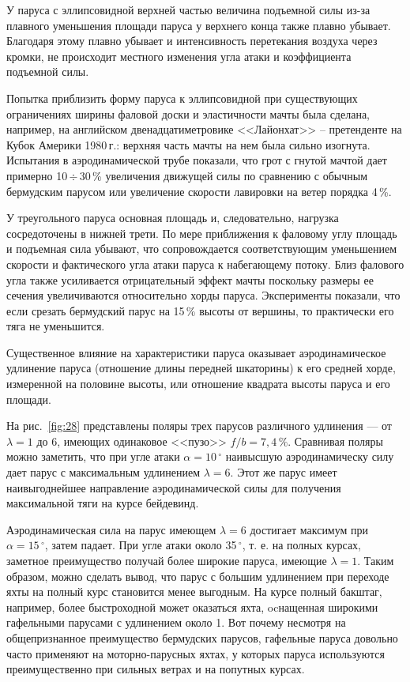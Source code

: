 \documentclass[a4paper, 12pt, twoside, final, book, russian, fittopage, cyremdash]{ncc}
\newcommand{\gr}{\ensuremath{\,^\circ}\xspace}
\newcommand{\otdo}{\,\ensuremath{\div}\,}
\newcommand{\ris}[1]{\ref{fig:#1}}
\begin{document}
У паруса с эллипсовидной верхней частью величина подъемной силы из-за плавного уменьшения площади паруса у верхнего конца также плавно убывает. Благодаря этому плавно убывает и интенсивность перетекания воздуха через кромки, не происходит местного изменения угла атаки и коэффициента подъемной силы. 

Попытка приблизить форму паруса к эллипсовидной при существующих ограничениях ширины фаловой доски и эластичности мачты была сделана, например, на английском двенадцатиметровике <<Лайонхат>> \--- претенденте на Кубок Америки 1980\,г.: верхняя часть мачты на нем была сильно изогнута. Испытания в аэродинамической трубе показали, что грот с гнутой мачтой дает примерно 10\otdo 30\,\% увеличения движущей силы по сравнению с обычным бермудским парусом или увеличение скорости лавировки на ветер порядка 4\,\%.
 
У треугольного паруса основная площадь и, следовательно, нагрузка сосредоточены в нижней трети. По мере приближения к фаловому углу площадь и подъемная сила убывают, что сопровождается соответствующим уменьшением скорости и фактического угла атаки паруса к набегающему потоку. Близ фалового угла также усиливается отрицательный эффект мачты поскольку размеры ее сечения увеличиваются относительно хорды паруса. Эксперименты показали, что если срезать бермудский парус на 15\,\% высоты от вершины, то практически его тяга не уменьшится. 

Существенное влияние на характеристики паруса оказывает аэродинамическое удлинение паруса (отношение длины передней шкаторины) к его средней хорде, измеренной на половине высоты, или отношение квадрата высоты паруса и его площади.

На рис.~\ris{28} представлены поляры трех парусов различного удлинения --- от $\lambda = 1$ до 6, имеющих одинаковое <<пузо>> $f/b=7,4\,\%$. Сравнивая поляры можно заметить, что при угле атаки $\alpha = 10\gr$ наивысшую аэродинамическу силу дает парус с максимальным удлинением $\lambda = 6$. Этот же парус имеет наивыгоднейшее направление аэродинамической силы для получения максимальной тяги на курсе бейдевинд. 

Аэродинамическая сила на парус имеющем $\lambda = 6$ достигает максимум при $\alpha = 15\gr$, затем падает. При угле атаки около 35\gr, т. е. на полных курсах, заметное преимущество получай более широкие паруса, имеющие $\lambda = 1$. Таким образом, можно сделать вывод, что парус с большим удлинением при переходе яхты на полный курс становится менее выгодным. На курсе полный бакштаг, например, более быстроходной может оказаться яхта, ocнащенная широкими гафельными парусами с удлинением около 1. Вот почему несмотря на общепризнанное преимущество бермудских парусов, гафельные паруса довольно часто применяют на моторно-парусных яхтах, у которых паруса используются преимущественно при сильных ветрах и на попутных курсах. 
\end{document}
